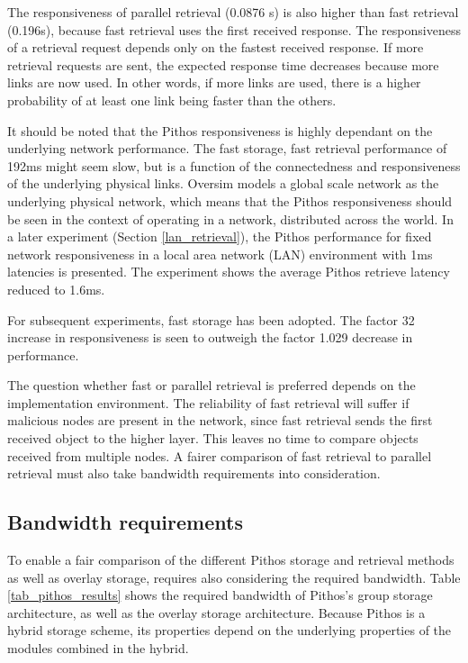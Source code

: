 The responsiveness of parallel retrieval (0.0876 s) is also higher than fast retrieval (0.196s), because fast retrieval uses the first received response. The responsiveness of a retrieval request depends only on the fastest received response. If more retrieval requests are sent, the expected response time decreases because more links are now used. In other words, if more links are used, there is a higher probability of at least one link being faster than the others.

It should be noted that the Pithos responsiveness is highly dependant on the underlying network performance. The fast storage, fast retrieval performance of 192ms might seem slow, but is a function of the connectedness and responsiveness of the underlying physical links. Oversim models a global scale network as the underlying physical network, which means that the Pithos responsiveness should be seen in the context of operating in a network, distributed across the world. In a later experiment (Section \ref{lan_retrieval}), the Pithos performance for fixed network responsiveness in a local area network (LAN) environment with 1ms latencies is presented. The experiment shows the average Pithos retrieve latency reduced to 1.6ms.

For subsequent experiments, fast storage has been adopted. The factor 32 increase in responsiveness is seen to outweigh the factor 1.029 decrease in performance.

The question whether fast or parallel retrieval is preferred depends on the implementation environment. The reliability of fast retrieval will suffer if malicious nodes are present in the network, since fast retrieval sends the first received object to the higher layer. This leaves no time to compare objects received from multiple nodes. A fairer comparison of fast retrieval to parallel retrieval must also take bandwidth requirements into consideration.

\subsection{Bandwidth requirements}
\label{bandwidth_requirements}

To enable a fair comparison of the different Pithos storage and retrieval methods as well as overlay storage, requires also considering the required bandwidth. Table \ref{tab_pithos_results} shows the required bandwidth of Pithos's group storage architecture, as well as the overlay storage architecture. Because Pithos is a hybrid storage scheme, its properties depend on the underlying properties of the modules combined in the hybrid.

